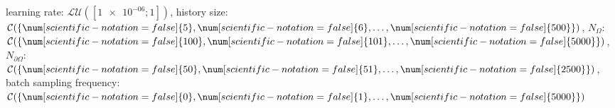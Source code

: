 learning rate: $\mathcal{LU}([\num[scientific-notation=true]{1e-06}; \num[scientific-notation=false]{1}])$, history size: $\mathcal{C}(\{\num[scientific-notation=false]{5},\num[scientific-notation=false]{6},\text{\dots},\num[scientific-notation=false]{500}\})$, $N_{\Omega}$: $\mathcal{C}(\{\num[scientific-notation=false]{100},\num[scientific-notation=false]{101},\text{\dots},\num[scientific-notation=false]{5000}\})$, $N_{\partial\Omega}$: $\mathcal{C}(\{\num[scientific-notation=false]{50},\num[scientific-notation=false]{51},\text{\dots},\num[scientific-notation=false]{2500}\})$, batch sampling frequency: $\mathcal{C}(\{\num[scientific-notation=false]{0},\num[scientific-notation=false]{1},\text{\dots},\num[scientific-notation=false]{5000}\})$